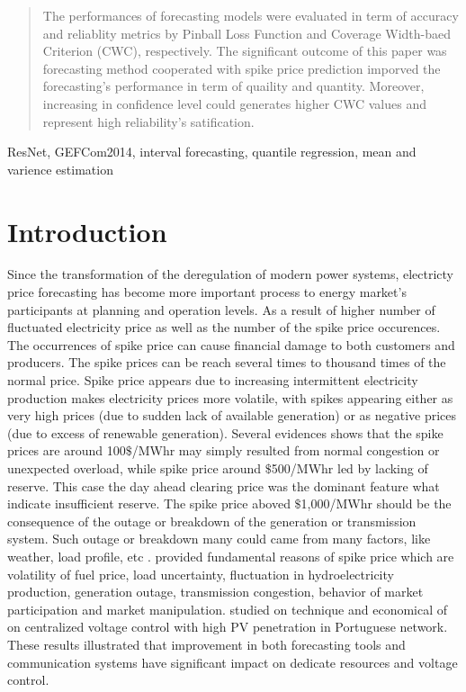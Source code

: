 \documentclass[review]{elsarticle}
\begin{document}
\begin{frontmatter}
\begin{abstract}
      The performances of forecasting models were evaluated in term of accuracy and reliablity metrics by Pinball Loss Function and Coverage Width-baed Criterion (CWC), respectively.
      The significant outcome of this paper was forecasting method cooperated with spike price prediction imporved the forecasting's performance in term of quaility and quantity.
      Moreover, increasing in confidence level could generates higher CWC values and represent high reliability's satification.
    \end{abstract}

    \begin{keyword}
      ResNet, GEFCom2014, interval forecasting, quantile regression, mean and varience estimation
    \end{keyword}

  \end{frontmatter}

  \linenumbers

  \section{Introduction}

    Since the transformation of the deregulation of modern power systems, electricty price forecasting has become more important process to energy market's participants at planning and operation levels.
    As a result of higher number of fluctuated electricity price as well as the number of the spike price occurences.
    The occurrences of spike price can cause financial damage to both customers and producers.
    The spike prices can be reach several times to thousand times of the normal price.
    Spike price appears due to increasing intermittent electricity production makes electricity prices more volatile, with spikes appearing either as very high prices (due to sudden lack of available generation) or as negative prices (due to excess of renewable generation).
    Several evidences shows that the spike prices are around 100$\$$/MWhr may simply resulted from normal congestion or unexpected overload, while spike price around $\$$500/MWhr led by lacking of reserve.
    This case the day ahead clearing price was the dominant feature what indicate insufficient reserve. The spike price aboved $\$$1,000/MWhr should be the consequence of the outage or breakdown of the generation or transmission system.
    Such outage or breakdown many could came from many factors, like weather, load profile, etc  \cite{He2016}.
    \cite{SINGHAL2011550} provided fundamental reasons of spike price which are volatility of fuel price, load uncertainty, fluctuation in hydroelectricity production, generation outage, transmission congestion, behavior of market participation and market manipulation.
    \cite{GONZALEZSOTRES2017338} studied on technique and economical of on centralized voltage control with high PV penetration in Portuguese network.
    These results illustrated that improvement in both forecasting tools and communication systems have significant impact on dedicate resources and voltage control.
\end{document}
